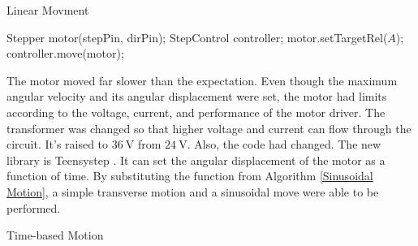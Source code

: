 \begin{algorithm}[H]
    \caption{Linear Movment}
    \label{Linear Movement}
    \begin{algorithmic}[1]
    \Statex Stepper motor(stepPin, dirPin);
    \Statex StepControl controller;
    \State {}
            \State motor.setTargetRel($A$);
            \State {}
            \State controller.move(motor);
            \State {}
        \EndFunction
    \EndProcedure
    \end{algorithmic}
\end{algorithm}

The motor moved far slower than the expectation. Even though the maximum angular velocity and its angular displacement were set, the motor had limits according to the voltage, current, and performance of the motor driver. The transformer was changed so that higher voltage and current can flow through the circuit. It's raised to $36\mathrm{~V}$ from $24\mathrm{~V}$. Also, the code had changed. The new library is Teensystep \cite{luni64}. It can set the angular displacement of the motor as a function of time. By substituting the function from Algorithm \ref{Sinusoidal Motion}, a simple transverse motion and a sinusoidal move were able to be performed.

\begin{algorithm}[H]
    \caption{Time-based Motion}
    \label{Sinusoidal Motion}
    \begin{algorithmic}[1]
            \EndIf
        \EndFor
        \EndProcedure
    \end{algorithmic}
\end{algorithm}

